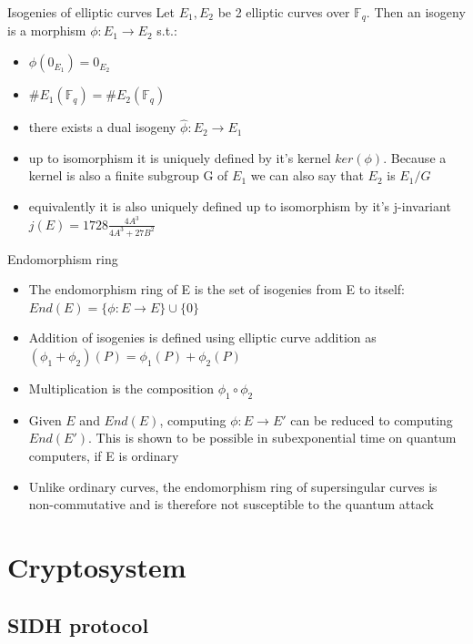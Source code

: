 \documentclass{beamer}
\begin{document}
\begin{frame}{Isogenies of elliptic curves}  %
Let $E_1,E_2$ be 2 elliptic curves over $\mathbb{F}_q$. Then an isogeny is a morphism $\phi: E_1 \to E_2$ s.t.:
\begin{itemize}[\textbullet]
	\item $\phi(0_{E_1})= 0_{E_2}$
	\item $\#E_1(\mathbb{F}_q) = \#E_2(\mathbb{F}_q)$
	\item there exists a dual isogeny $\hat{\phi}: E_2 \to E_1$
	\item up to isomorphism it is uniquely defined by it's kernel $ker(\phi)$. Because a kernel is also a finite subgroup G of $E_1$ we can also say that $E_2$ is $E_1/G$
	\item equivalently it is also uniquely defined up to isomorphism by it's j-invariant $j(E)=1728\frac{4A^3}{4A^3+27B^2}$
\end{itemize}


\end{frame}
\begin{frame}{Endomorphism ring}


\begin{itemize}[\textbullet]
	\item The endomorphism ring of E is the set of isogenies from E to itself: $End(E) = \{\phi:E\to E\} \cup \{0\}$
	\item Addition of isogenies is defined using elliptic curve addition as $(\phi_1+\phi_2)(P) =  \phi_1(P) + \phi_2(P)$
	\item Multiplication is the composition $\phi_1 \circ \phi_2$
	\item Given $E$ and $End(E)$, computing $\phi: E \to E'$ can be reduced to computing $End(E')$. This is shown to be possible in subexponential time on quantum computers, if E is ordinary
	\item Unlike ordinary curves, the endomorphism ring of supersingular curves is non-commutative and is therefore not susceptible to the quantum attack
\end{itemize}

\end{frame}


\section{Cryptosystem}

\subsection{SIDH protocol}
\end{document}
